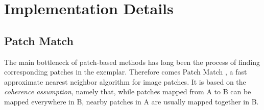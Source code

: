 
\section{Implementation Details}

\subsection{Patch Match}

The main bottleneck of patch-based methods has long been the process of finding corresponding patches in the exemplar. Therefore comes Patch Match \cite{Barnes09}, a fast approximate nearest neighbor algorithm for image patches.
It is based on the \emph{coherence assumption}, namely that, while patches mapped from A to B can be mapped everywhere in B, nearby patches in A are usually mapped together in B.

